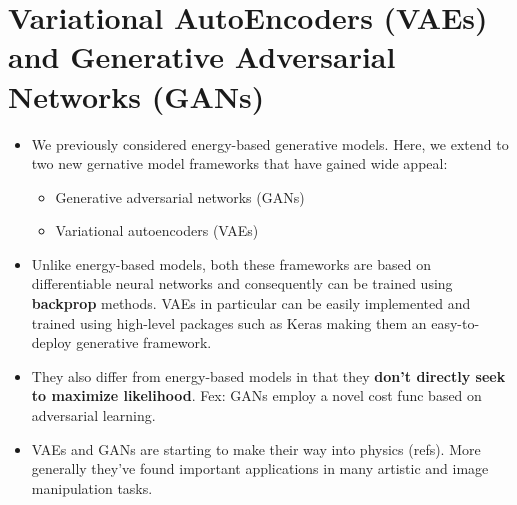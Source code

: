 \documentclass[norsk,a4paper,11pt]{article}
\begin{document}
\section{Variational AutoEncoders (VAEs) and Generative Adversarial Networks (GANs)}
\begin{itemize}
	\item We previously considered energy-based generative models. Here, we extend to two new gernative model frameworks that have gained wide appeal:
	\begin{itemize}
		\item Generative adversarial networks (GANs)
		\item Variational autoencoders (VAEs)
	\end{itemize}
	\item Unlike energy-based models, both these frameworks are based on differentiable neural networks and consequently can be trained using \textbf{backprop} methods. VAEs in particular can be easily implemented and trained using high-level packages such as Keras making them an easy-to-deploy generative framework.
	\item They also differ from energy-based models in that they \textbf{don't directly seek to maximize likelihood}. Fex: GANs employ a novel cost func based on adversarial learning. 
	\item VAEs and GANs are starting to make their way into physics (refs). More generally they've found important applications in many artistic and image manipulation tasks.
\end{itemize}
\end{document}
